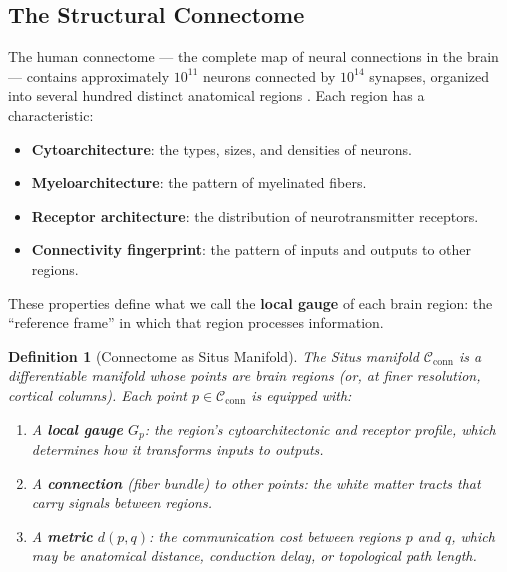 \documentclass[12pt,a4paper]{article}
\newtheorem{definition}[theorem]{Definition}
\theoremstyle{remark}
\newcommand{\Situs}{\textsf{Situs}}
\newcommand{\Connectome}{\mathcal{C}_{\text{conn}}}
\begin{document}
\subsection{The Structural Connectome}

The human connectome --- the complete map of neural connections in the brain
--- contains approximately $10^{11}$ neurons connected by $10^{14}$ synapses,
organized into several hundred distinct anatomical regions \cite{sporns2005human,
vanessen2013WU-Minn}. Each region has a characteristic:
\begin{itemize}
    \item \textbf{Cytoarchitecture}: the types, sizes, and densities of neurons.
    \item \textbf{Myeloarchitecture}: the pattern of myelinated fibers.
    \item \textbf{Receptor architecture}: the distribution of neurotransmitter receptors.
    \item \textbf{Connectivity fingerprint}: the pattern of inputs and outputs to other regions.
\end{itemize}

These properties define what we call the \textbf{local gauge} of each brain
region: the ``reference frame'' in which that region processes information.

\begin{definition}[Connectome as Situs Manifold]\label{def:connectome-situs}
The \Situs{} manifold $\Connectome$ is a differentiable manifold whose points
are brain regions (or, at finer resolution, cortical columns). Each point
$p \in \Connectome$ is equipped with:
\begin{enumerate}[label=(\roman*)]
    \item A \textbf{local gauge} $G_p$: the region's cytoarchitectonic and
          receptor profile, which determines how it transforms inputs to outputs.
    \item A \textbf{connection} (fiber bundle) to other points: the white matter
          tracts that carry signals between regions.
    \item A \textbf{metric} $d(p, q)$: the communication cost between regions
          $p$ and $q$, which may be anatomical distance, conduction delay, or
          topological path length.
\end{enumerate}
\end{definition}
\end{document}
